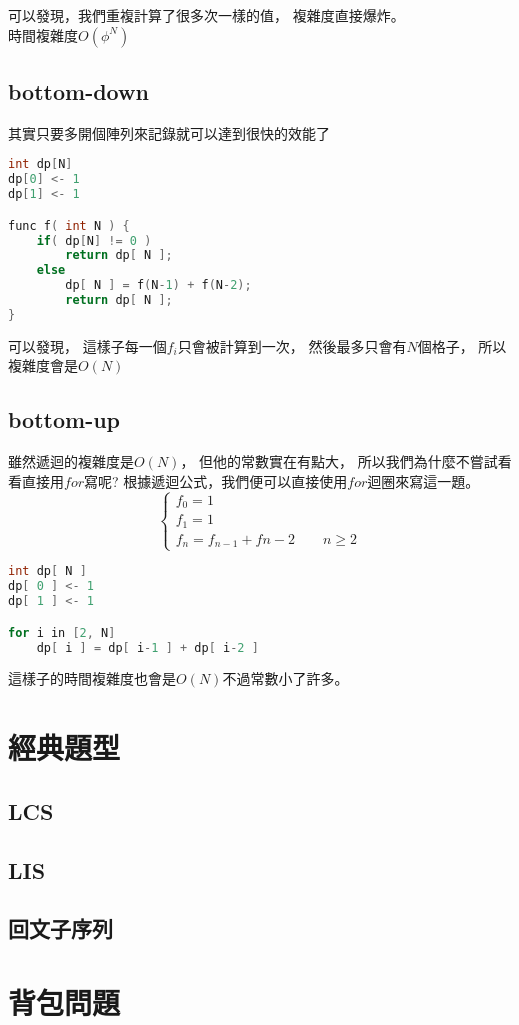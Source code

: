 \documentclass[12pt,oneside]{article}
\begin{document}
\noindent 可以發現，我們重複計算了很多次一樣的值，
複雜度直接爆炸。\\
時間複雜度$O(\phi^N)$

\subsection{bottom-down}
其實只要多開個陣列來記錄就可以達到很快的效能了
\begin{lstlisting}[language=C++ ,escapeinside=``]
int dp[N]
dp[0] <- 1
dp[1] <- 1

func f( int N ) {
    if( dp[N] != 0 ) 
        return dp[ N ];
    else 
        dp[ N ] = f(N-1) + f(N-2);
        return dp[ N ];
}
\end{lstlisting}
可以發現，
這樣子每一個$f_i$只會被計算到一次，
然後最多只會有$N$個格子，
所以複雜度會是$O(N)$
\subsection{bottom-up}
雖然遞迴的複雜度是$O(N)$，
但他的常數實在有點大，
所以我們為什麼不嘗試看看直接用$for$寫呢?
根據遞迴公式，我們便可以直接使用$for$迴圈來寫這一題。
$$
\begin{cases}
    f_0 = 1 \\
    f_1 = 1 \\
    f_n = f_{n-1} + f{n-2} \qquad n\geq 2
\end{cases}
$$

\begin{lstlisting}[language=C++, escapeinside=``]
int dp[ N ] 
dp[ 0 ] <- 1
dp[ 1 ] <- 1

for i in [2, N] 
    dp[ i ] = dp[ i-1 ] + dp[ i-2 ] 
\end{lstlisting}

這樣子的時間複雜度也會是$O(N)$不過常數小了許多。
\section{經典題型}
\subsection{LCS}
\subsection{LIS}
\subsection{回文子序列}
\section{背包問題}
\end{document}
